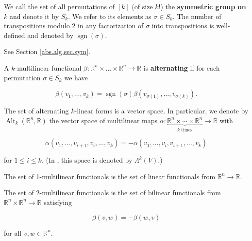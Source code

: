 \begin{definition}\label{ra.def.symm.perm}

We call the set of all permutations of \([k]\) (of size \(k!\)) the \textbf{symmetric group on \(k\)} and denote it by \(S_k\). We refer to its elements as \(\sigma \in S_k\). The number of transpositions modulo 2 in any factorization of \(\sigma\) into transpositions is well-defined and denoted by \(\operatorname{sgn}(\sigma)\).

See Section \ref{abs.alg.sec.sym}.

\end{definition}

\begin{definition}

A \(k\)-multilinear functional \(\beta: \mathbb{R}^n \times \ldots \times \mathbb{R}^n \to \mathbb{R}\) is \textbf{alternating} if for each permutation \(\sigma \in S_k\) we have

\[
\beta(v_1, \ldots, v_k) = \operatorname{sgn}(\sigma) \beta(v_{\sigma(1)}, \ldots, v_{\sigma(k)}).
\]

The set of alternating \(k\)-linear forms is a vector space. In particular, we denote by \(\operatorname{Alt}_k(\mathbb{R}^n, \mathbb{R})\) the vector space of multilinear maps \(\alpha: \underbrace{\mathbb{R}^n \times \cdots \times \mathbb{R}^n}_{k \text{ times}} \to \mathbb{R}\) with 

\[
\alpha (v_1 , \ldots, v_{i+1}, v_i, \ldots, v_k) = - \alpha(v_1, \ldots, v_i, v_{i+1}, \ldots, v_k)
\]

for \(1 \leq i \leq k\). (In \citet{spivak1971calculus}, this space is denoted by \(\Lambda^k(V)\).)

\end{definition}

\begin{example}\label{ra.ex.1.multi.ex}

The set of 1-multilinear functionals is the set of linear functionals from \(\mathbb{R}^n \to \mathbb{R}\).

\end{example}

\begin{example}\label{ra.ex.2.multi.ex}

The set of 2-multilinear functionals is the set of bilinear functionals from \(\mathbb{R}^n \times \mathbb{R}^n \to \mathbb{R}\) satisfying 

\[
\beta(v, w) = - \beta(w, v)
\]

for all \(v, w \in \mathbb{R}^n \).

\end{example}

